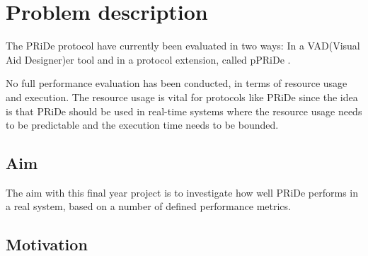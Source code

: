 
\section{Problem description}
\label{sec:problem_description}



The PRiDe protocol have currently been evaluated in two ways: In a VAD(Visual Aid Designer)er tool \cite{Syber2007} and in a protocol extension, called pPRiDe \cite[]{Olby07}. 

No full performance evaluation has been conducted, in terms of resource usage and execution. The resource usage is vital for protocols like PRiDe since the idea is that PRiDe should be used in real-time systems where the resource usage needs to be predictable and the execution time needs to be bounded. 

\subsection{Aim}
\label{subsec:aim}

The aim with this final year project is to investigate how well PRiDe performs in a real system, based on a number of defined performance metrics.  

\subsection{Motivation}
\label{subsec:motive}

